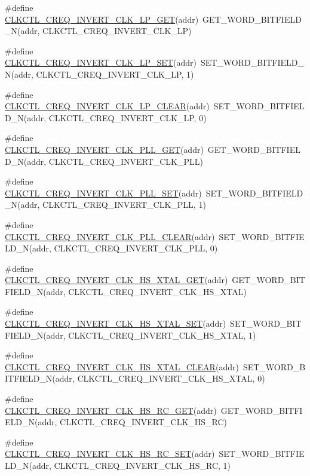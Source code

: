 \begin{DoxyCompactItemize}
\#define \hyperlink{a00544_a04283fa5901b7d6f7c7969094597772f}{CLKCTL\_\-CREQ\_\-INVERT\_\-CLK\_\-LP\_\-GET}(addr)~GET\_\-WORD\_\-BITFIELD\_\-N(addr, CLKCTL\_\-CREQ\_\-INVERT\_\-CLK\_\-LP)
\item 
\#define \hyperlink{a00544_a3fd0ef5155c265a84af4b6dbc9171120}{CLKCTL\_\-CREQ\_\-INVERT\_\-CLK\_\-LP\_\-SET}(addr)~SET\_\-WORD\_\-BITFIELD\_\-N(addr, CLKCTL\_\-CREQ\_\-INVERT\_\-CLK\_\-LP, 1)
\item 
\#define \hyperlink{a00544_aec7138d18848d438a6002d318d622b1f}{CLKCTL\_\-CREQ\_\-INVERT\_\-CLK\_\-LP\_\-CLEAR}(addr)~SET\_\-WORD\_\-BITFIELD\_\-N(addr, CLKCTL\_\-CREQ\_\-INVERT\_\-CLK\_\-LP, 0)
\item 
\#define \hyperlink{a00544_aa405ed5ff67b70174e6d24c15818fda0}{CLKCTL\_\-CREQ\_\-INVERT\_\-CLK\_\-PLL\_\-GET}(addr)~GET\_\-WORD\_\-BITFIELD\_\-N(addr, CLKCTL\_\-CREQ\_\-INVERT\_\-CLK\_\-PLL)
\item 
\#define \hyperlink{a00544_a23a91607fbe8e64f97b5f952b4916f96}{CLKCTL\_\-CREQ\_\-INVERT\_\-CLK\_\-PLL\_\-SET}(addr)~SET\_\-WORD\_\-BITFIELD\_\-N(addr, CLKCTL\_\-CREQ\_\-INVERT\_\-CLK\_\-PLL, 1)
\item 
\#define \hyperlink{a00544_a03be9de1e913055beb418ccc50b66468}{CLKCTL\_\-CREQ\_\-INVERT\_\-CLK\_\-PLL\_\-CLEAR}(addr)~SET\_\-WORD\_\-BITFIELD\_\-N(addr, CLKCTL\_\-CREQ\_\-INVERT\_\-CLK\_\-PLL, 0)
\item 
\#define \hyperlink{a00544_afd760372614ee7c165e4bed6e3f736bd}{CLKCTL\_\-CREQ\_\-INVERT\_\-CLK\_\-HS\_\-XTAL\_\-GET}(addr)~GET\_\-WORD\_\-BITFIELD\_\-N(addr, CLKCTL\_\-CREQ\_\-INVERT\_\-CLK\_\-HS\_\-XTAL)
\item 
\#define \hyperlink{a00544_a958e0f3d87d68ff8e48db72aeafaa44c}{CLKCTL\_\-CREQ\_\-INVERT\_\-CLK\_\-HS\_\-XTAL\_\-SET}(addr)~SET\_\-WORD\_\-BITFIELD\_\-N(addr, CLKCTL\_\-CREQ\_\-INVERT\_\-CLK\_\-HS\_\-XTAL, 1)
\item 
\#define \hyperlink{a00544_ae202d9e8f5c542294033eac4c924fc59}{CLKCTL\_\-CREQ\_\-INVERT\_\-CLK\_\-HS\_\-XTAL\_\-CLEAR}(addr)~SET\_\-WORD\_\-BITFIELD\_\-N(addr, CLKCTL\_\-CREQ\_\-INVERT\_\-CLK\_\-HS\_\-XTAL, 0)
\item 
\#define \hyperlink{a00544_aa42675079000d77feca6827867b79807}{CLKCTL\_\-CREQ\_\-INVERT\_\-CLK\_\-HS\_\-RC\_\-GET}(addr)~GET\_\-WORD\_\-BITFIELD\_\-N(addr, CLKCTL\_\-CREQ\_\-INVERT\_\-CLK\_\-HS\_\-RC)
\item 
\#define \hyperlink{a00544_a601dc5d36fc8bd2b76dd8a8e0f75bbaf}{CLKCTL\_\-CREQ\_\-INVERT\_\-CLK\_\-HS\_\-RC\_\-SET}(addr)~SET\_\-WORD\_\-BITFIELD\_\-N(addr, CLKCTL\_\-CREQ\_\-INVERT\_\-CLK\_\-HS\_\-RC, 1)

\end{DoxyCompactItemize}
